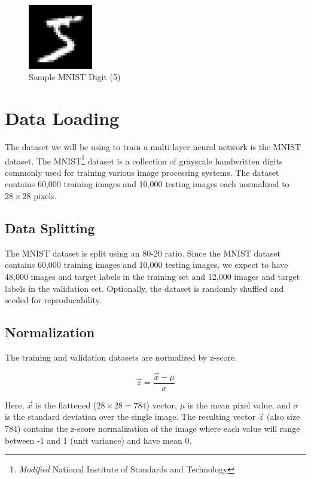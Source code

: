 \begin{figure}[!h]
	\centering
	\includegraphics[width=0.25\textwidth]{./images/mnist_digit.png}
	\caption{Sample MNIST Digit (5)}
	\label{fig:example}
\end{figure}


\section{Data Loading}
The dataset we will be using to train a multi-layer neural network is the
MNIST dataset. The {MNIST}\footnote{\textit{Modified} National Institute of
	Standards and Technology} dataset is a collection of grayscale handwritten
digits commonly used for training various image processing systems. The dataset
contains 60,000 training images and 10,000 testing images each normalized to $28
	\times 28$ pixels.

\subsection{Data Splitting}
The MNIST dataset is split using an 80-20 ratio. Since the MNIST dataset
contains 60,000 training images and 10,000 testing images, we expect to have
48,000 images and target labels in the training set and 12,000 images and
target labels in the validation set. Optionally, the dataset is randomly
shuffled and seeded for reproducability.

\subsection{Normalization}
The training and validation datasets are normalized by z-score.

$$ \vec{z} = \frac{\vec{x} - \mu}{\sigma} $$

Here, $\vec{x}$ is the flattened ($ 28 \times 28 = 784$) vector, $\mu$ is
the mean pixel value, and $\sigma$ is the standard deviation over the single
image. The resulting vector $\vec{z}$ (also size $784$) contains the z-score
normalization of the image where each value will range between -1 and 1 (unit
variance) and have mean 0.

